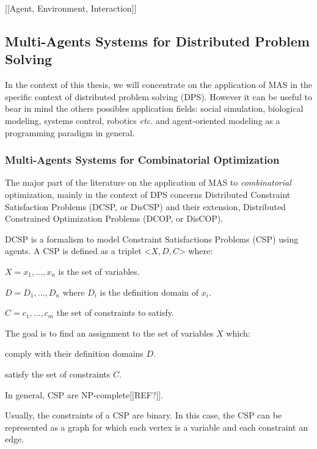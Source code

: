 [[Agent, Environment, Interaction]]

\subsection{Multi-Agents Systems for Distributed Problem Solving}

In the context of this thesis, we will concentrate on the application of MAS in the specific context of distributed problem solving (DPS). However it can be useful to bear in mind the others possibles application fields: social simulation, biological modeling, systems control, robotics \emph{etc.} and agent-oriented modeling as a programming paradigm in general.

\subsubsection{Multi-Agents Systems for Combinatorial Optimization}

The major part of the literature on the application of MAS to \emph{combinatorial} optimization, mainly in the context of DPS concerns Distributed Constraint Satisfaction Problems (DCSP, or DisCSP) and their extension, Distributed Constrained Optimization Problems (DCOP, or DisCOP).

DCSP is a formalism to model Constraint Satisfactions Problems (CSP) using agents. A CSP is defined as a triplet <$X,D,C$> where:
\begin{compactitem}
\item $X = {x_1, ..., x_n}$ is the set of variables.
\item $D = {D_1, ..., D_n}$ where $D_i$ is the definition domain of $x_i$.
\item $C ={c_1, ..., c_m}$ the set of constraints to satisfy.
\end{compactitem}

The goal is to find an assignment to the set of variables $X$ which:
\begin{compactitem}
\item comply with their definition domains $D$.
\item satisfy the set of constraints $C$.
\end{compactitem}

In general, CSP are NP-complete[[REF?]].

Usually, the constraints of a CSP are binary. In this case, the CSP can be represented as a graph for which each vertex is a variable and each constraint an edge.

